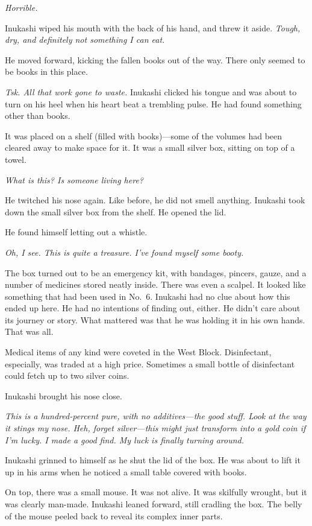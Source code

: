 \emph{Horrible.}

Inukashi wiped his mouth with the back of his hand, and threw it aside.
\emph{Tough, dry, and definitely not something I can eat.}

He moved forward, kicking the fallen books out of the way. There only
seemed to be books in this place.

\emph{Tsk. All that work gone to waste.} Inukashi clicked his tongue and was
about to turn on his heel when his heart beat a trembling pulse. He had
found something other than books.

It was placed on a shelf (filled with books)---some of the volumes had
been cleared away to make space for it. It was a small silver box,
sitting on top of a towel.

\mybreak

\emph{What is this? Is someone living here?}

He twitched his nose again. Like before, he did not smell anything.
Inukashi took down the small silver box from the shelf. He opened the
lid.

He found himself letting out a whistle.

\emph{Oh, I see. This is quite a treasure. I've found myself some booty.}

The box turned out to be an emergency kit, with bandages, pincers,
gauze, and a number of medicines stored neatly inside. There was even a
scalpel. It looked like something that had been used in No.~6. Inukashi
had no clue about how this ended up here. He had no intentions of
finding out, either. He didn't care about its journey or story. What
mattered was that he was holding it in his own hands. That was all.

Medical items of any kind were coveted in the West Block. Disinfectant,
especially, was traded at a high price. Sometimes a small bottle of
disinfectant could fetch up to two silver coins.

Inukashi brought his nose close.

\emph{This is a hundred-percent pure, with no additives---the good stuff. Look
at the way it stings my nose. Heh, forget silver---this might just
transform into a gold coin if I'm lucky. I made a good find. My luck is
finally turning around.}

Inukashi grinned to himself as he shut the lid of the box. He was about
to lift it up in his arms when he noticed a small table covered with
books.

On top, there was a small mouse. It was not alive. It was skilfully
wrought, but it was clearly man-made. Inukashi leaned forward, still
cradling the box. The belly of the mouse peeled back to reveal its
complex inner parts.

